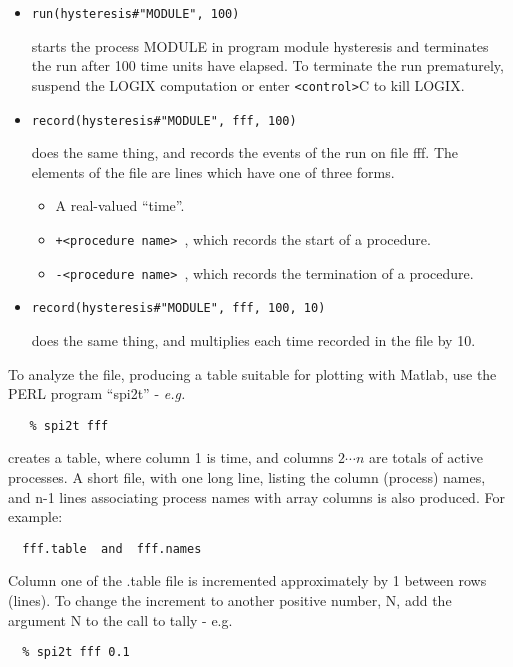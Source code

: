 \begin{itemize}
\item
  \verb+run(hysteresis#"MODULE", 100)+

\noindent
starts the process  MODULE  in program module  hysteresis  and
terminates the run after 100 time units have elapsed.  To 
terminate the run prematurely, suspend the LOGIX computation
or enter  \verb+<control>+C  to kill LOGIX.

\item
  \verb+record(hysteresis#"MODULE", fff, 100)+

\noindent
does the same thing, and records the events of the run on file fff.
The elements of the file are lines which have one of three forms.
\begin{itemize}
\item
A real-valued ``time''.
\item
\verb:+<procedure name> :, which records the start of a procedure.
\item
\verb:-<procedure name> :, which records the termination of a procedure.
\end{itemize}

\item
  \verb+record(hysteresis#"MODULE", fff, 100, 10)+

\noindent
does the same thing, and multiplies each time recorded in the file
by 10.
\end{itemize}

\noindent
To analyze the file, producing a table suitable for plotting with
Matlab, use the PERL program ``spi2t'' - {\em e.g.}

\begin{verbatim}
   % spi2t fff
\end{verbatim}

creates a table, where column 1 is time, and columns $2 \cdots n$ are totals
of active processes.  A short file, with one long line, listing the
column (process) names, and n-1 lines associating process names with
array columns is also produced.  For example:

\begin{verbatim}
  fff.table  and  fff.names
\end{verbatim}

\noindent
Column one of the .table file is incremented approximately by 1 between
rows (lines).  To change the increment to another positive number, N,
add the argument N to the call to tally - e.g.

\begin{verbatim}
  % spi2t fff 0.1
\end{verbatim}

